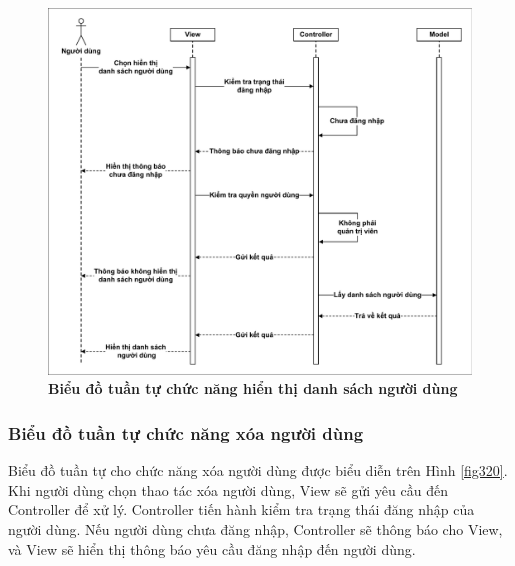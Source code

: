 \documentclass{article}
\begin{document}
	 \begin{figure}[!ht]
	 	\centering
	 	\includegraphics[trim= 10pt 10pt 10pt 10pt, clip, width=16cm]{sequence_fig319_1.pdf}
	 	\caption [Biểu đồ tuần tự chức năng hiển thị danh sách người dùng]{\bfseries \fontsize{12pt}{0pt}\selectfont Biểu đồ tuần tự chức năng hiển thị danh sách người dùng}
	 	\label{fig319}
	 \end{figure}
	 
	 \subsubsection{Biểu đồ tuần tự chức năng xóa người dùng}
	 
	 Biểu đồ tuần tự cho chức năng xóa người dùng được biểu diễn trên Hình \ref{fig320}. Khi người dùng chọn thao tác xóa người dùng, View sẽ gửi yêu cầu đến Controller để xử lý. Controller tiến hành kiểm tra trạng thái đăng nhập của người dùng. Nếu người dùng chưa đăng nhập, Controller sẽ thông báo cho View, và View sẽ hiển thị thông báo yêu cầu đăng nhập đến người dùng.
	 
\end{document}
